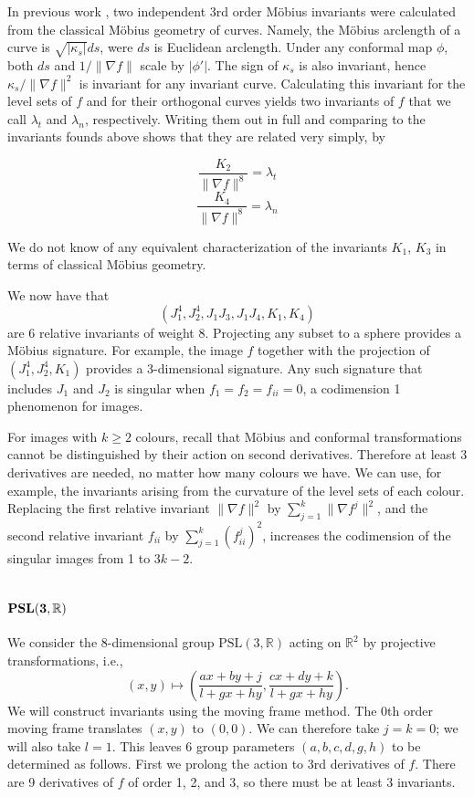 \documentclass{article}
\def\R{\mathbb{R}}
\begin{document}
In previous work \cite{mobius}, two independent 3rd order M\"obius invariants were calculated
from the classical M\"obius geometry of curves. Namely, the M\"obius arclength 
of a curve is $\sqrt{|\kappa_s|}ds$, were $ds$ is Euclidean arclength. Under any conformal map $\phi$,
both $ds$ and $1/\|\nabla f\|$ scale by $|\phi'|$. The sign of $\kappa_s$ is also  invariant,
hence $\kappa_s/\|\nabla f\|^2$ is  invariant for any invariant curve. Calculating this invariant
for the level sets of $f$ and for their orthogonal curves yields two invariants of $f$ that
we call $\lambda_t$ and $\lambda_n$, respectively. Writing 
them out in full and comparing to the invariants founds above shows that they are related very simply, by

$$ \frac{K_2}{\|\nabla f\|^8} = \lambda_t$$
$$\frac{K_4}{\|\nabla f\|^8} =\lambda_n$$

We do not know of any equivalent characterization of the invariants $K_1$, $K_3$ in
terms of classical M\"obius geometry.

We now have that
$$ (J_1^4, J_2^4, J_1 J_3, J_1 J_4, K_1, K_4)$$
are 6 relative invariants of weight 8. Projecting any subset to a sphere provides a M\"obius signature.
For example, the image $f$ together with the projection of $(J_1^4, J_2^4, K_1)$ provides a 3-dimensional signature.
Any such signature that includes $J_1$ and $J_2$ is singular when $f_1=f_2=f_{ii}=0$, a codimension 1
phenomenon for images. 

For images with $k\ge 2$ colours, recall that M\"obius and conformal transformations cannot be distinguished
by their action on second derivatives. Therefore at least 3 derivatives are needed, no matter how many 
colours we have. We can use, for example, the invariants arising from the curvature of the level sets of
each colour. Replacing the first relative invariant $\|\nabla f\|^2$ by $\sum_{j=1}^k \|\nabla f^j\|^2$,
and the second relative invariant $f_{ii}$ by $\sum_{j=1}^k (f^j_{ii})^2$, increases
the codimension of the singular images from 1 to $3k-2$.

\section{{\bf $\mathbf{PSL}({\bf 3},\R)$}}

We consider the 8-dimensional group $\mathrm{PSL}(3,\R)$ acting on $\R^2$ by projective transformations, i.e.,
$$(x,y) \mapsto \left(\frac{a x + b y + j}{l + g x + h y}, \frac{c x + d y + k}{l+ g x + h y}\right).$$
We will construct invariants using the moving frame method. The 0th order moving frame translates $(x,y)$ to
$(0,0)$. We can therefore take $j=k=0$; we will also take $l=1$. This leaves 6 group parameters $(a,b,c,d,g,h)$
to be determined as follows. First we prolong the action to 3rd derivatives of $f$. There are 9 derivatives of
$f$ of order 1, 2, and 3, so there must be at least 3 invariants.
\end{document}
